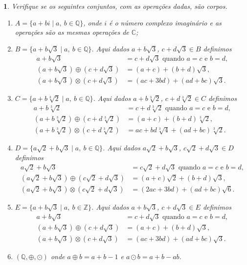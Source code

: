 \documentclass[12pt]{exam}
\newtheorem{exercicio}{}
\newcommand{\z}{\mathbb{Z}}
\newcommand{\rac}{\mathbb{Q}}
\newcommand{\complex}{\mathbb{C}}
\begin{document}
\begin{exercicio}
Verifique se os seguintes conjuntos, com as opera\c{c}\~oes dadas, s\~ao corpos.
\begin{enumerate}[label={\alph*})]
    \item $A = \{ a + bi \mid a,\ b \in \rac\}$, onde $i$ \'e o n\'umero complexo imagin\'ario e as opera\c{c}\~oes s\~ao as mesmas opera\c{c}\~oes de $\complex$;
    \item $B = \{ a + b\sqrt{3} \mid a,\ b \in \rac\}$. Aqui dados $a + b\sqrt{3}$, $c + d\sqrt{3} \in B$ definimos
    \begin{align*}
      a + b\sqrt{3} &= c + d\sqrt{3} \mbox{ quando } a = c \mbox{ e } b = d,\\
      (a + b\sqrt{3}) \oplus (c + d\sqrt{3}) &= (a + c) + (b + d)\sqrt{3},\\
      (a + b\sqrt{3}) \otimes (c + d\sqrt{3}) &= (ac + 3bd) + (ad + bc)\sqrt{3}.
    \end{align*}
    \item $C = \{ a + b\sqrt[3]{2} \mid a,\ b \in \rac\}$. Aqui dados $a + b\sqrt[3]{2}$, $c + d\sqrt[3]{2} \in C$ definimos
    \begin{align*}
      a + b\sqrt[3]{2} &= c + d\sqrt[3]{2} \mbox{ quando } a = c \mbox{ e } b = d,\\
      (a + b\sqrt[3]{2}) \oplus (c + d\sqrt[3]{2}) &= (a + c) + (b + d)\sqrt[3]{2},\\
      (a + b\sqrt[3]{2}) \otimes (c + d\sqrt[3]{2}) &= ac + bd\sqrt[3]{4} + (ad + bc)\sqrt[3]{2}.
    \end{align*}
    \item $D = \{ a\sqrt{2} + b\sqrt{3} \mid a,\ b \in \rac\}$. Aqui dados $a\sqrt{2} + b\sqrt{3}$, $c\sqrt{2} + d\sqrt{3} \in D$ definimos
    \begin{align*}
      a\sqrt{2} + b\sqrt{3} &= c\sqrt{2} + d\sqrt{3} \mbox{ quando } a = c \mbox{ e } b = d,\\
      (a\sqrt{2} + b\sqrt{3}) \oplus (c\sqrt{2} + d\sqrt{3}) &= (a + c)\sqrt{2} + (b + d)\sqrt{3},\\
      (a\sqrt{2} + b\sqrt{3}) \otimes (c\sqrt{2} + d\sqrt{3}) &= (2ac + 3bd) + (ad + bc)\sqrt{6}.
    \end{align*}
    \item $E = \{ a + b\sqrt{3} \mid a,\ b \in \z\}$. Aqui dados $a + b\sqrt{3}$, $c + d\sqrt{3} \in E$ definimos
    \begin{align*}
      a + b\sqrt{3} &= c + d\sqrt{3} \mbox{ quando } a = c \mbox{ e } b = d,\\
      (a + b\sqrt{3}) \oplus (c + d\sqrt{3}) &= (a + c) + (b + d)\sqrt{3},\\
      (a + b\sqrt{3}) \otimes (c + d\sqrt{3}) &= (ac + 3bd) + (ad + bc)\sqrt{3}.
    \end{align*}
    \item $(\rac, \oplus, \odot)$ onde $a \oplus b = a + b - 1$ e $a \odot b = a + b - ab$.
  \end{enumerate}  
\end{exercicio}
\end{document}
